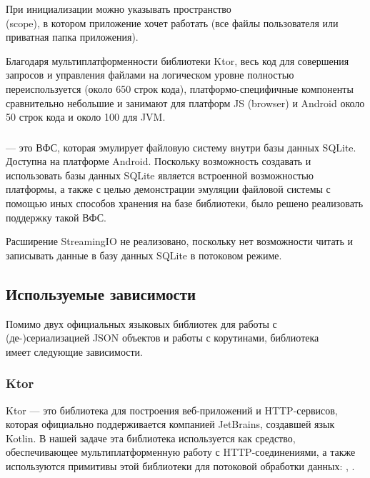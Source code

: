     При инициализации  можно указывать пространство\\ (scope), в котором приложение хочет работать (все файлы пользователя или приватная папка приложения).

    Благодаря мультиплатформенности библиотеки Ktor, весь код для совершения запросов и управления файлами на логическом уровне полностью переиспользуется (около 650 строк кода), платформо-специфичные компоненты сравнительно небольшие и занимают для платформ JS (browser) и Android около 50 строк кода и около 100 для JVM.
  \subsubsection{}
     --- это ВФС, которая эмулирует файловую систему внутри базы данных SQLite. Доступна на платформе Android. Поскольку возможность создавать и использовать базы данных SQLite является встроенной возможностью платформы, а также с целью демонстрации эмуляции файловой системы с помощью иных способов хранения на базе библиотеки, было решено реализовать поддержку такой ВФС. 

    Расширение StreamingIO не реализовано, поскольку нет возможности читать и записывать данные в базу данных SQLite в потоковом режиме.


\subsection{Используемые зависимости}
  Помимо двух официальных языковых библиотек для работы с\\ (де-)сериализацией JSON объектов и работы с корутинами, библиотека\\  имеет следующие зависимости.
  \subsubsection{Ktor}\label{dependencies-ktor}
    Ktor\cite{ktor} --- это библиотека для построения веб-приложений и HTTP-сервисов, которая официально поддерживается компанией JetBrains, создавшей язык Kotlin. В нашей задаче эта библиотека используется как средство, обеспечивающее мультиплатформенную работу с HTTP-соединениями, а также используются примитивы этой библиотеки для потоковой обработки данных: , .

